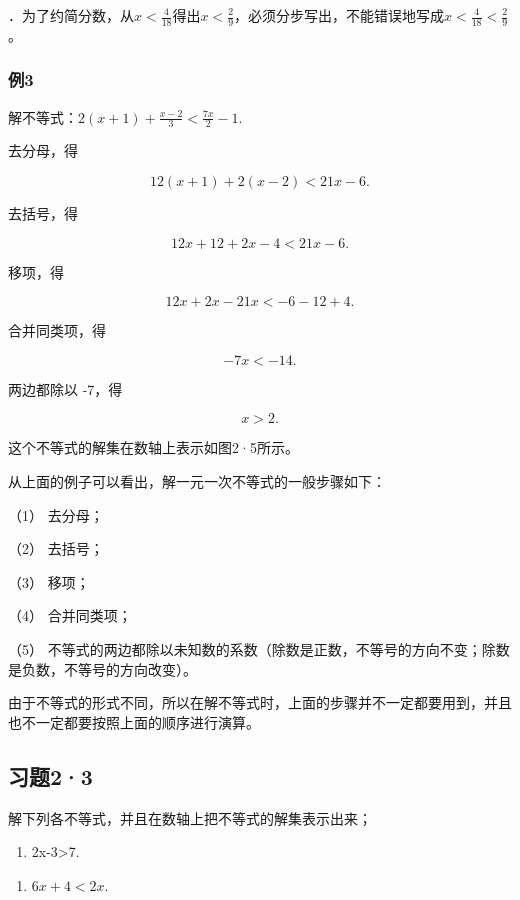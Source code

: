 ．为了约简分数，从\(x < \frac{4}{18}\)得出\(x < \frac{2}{9}\)，必须分步写出，不能错误地写成\(x < \frac{4}{18} < \frac{2}{9}\)。

\subsubsection{例3}

解不等式：\(2(x + 1) + \frac{x - 2}{3} < \frac{7x}{2} - 1.\)

 去分母，得

\[
12 (x + 1) + 2 (x - 2) <   21 x - 6.
\]

去括号，得

\[
12 x + 12 + 2 x - 4 <   21 x - 6.
\]

移项，得

\[
12 x + 2 x - 21 x <   - 6 - 12 + 4.
\]

合并同类项，得

\[
- 7 x <   - 14.
\]

两边都除以 -7，得

\[
x > 2.
\]

这个不等式的解集在数轴上表示如图2·5所示。

从上面的例子可以看出，解一元一次不等式的一般步骤如下：

（1） 去分母；

（2） 去括号；

（3） 移项；

（4） 合并同类项；

（5）
不等式的两边都除以未知数的系数（除数是正数，不等号的方向不变；除数是负数，不等号的方向改变）。

由于不等式的形式不同，所以在解不等式时，上面的步骤并不一定都要用到，并且也不一定都要按照上面的顺序进行演算。

\subsection{习题2·3}

解下列各不等式，并且在数轴上把不等式的解集表示出来；

\begin{enumerate}
\item
  2x-3\textgreater7.
\end{enumerate}

\begin{enumerate}[start=2]
\item
  \(6x + 4 < 2x.\)
\end{enumerate}


